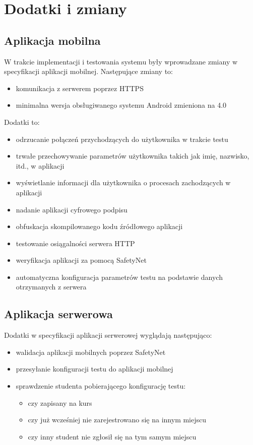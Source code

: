 \documentclass[eng]{mgr}
\begin{document}
		\section{Dodatki i zmiany}
		
			\subsection{Aplikacja mobilna}
			W trakcie implementacji i testowania systemu były wprowadzane zmiany w specyfikacji aplikacji mobilnej. Następujące zmiany to:
			\begin{itemize}
				\item komunikacja z serwerem poprzez HTTPS
				\item minimalna wersja obsługiwanego systemu Android zmieniona na 4.0
			\end{itemize}
			Dodatki to:
			\begin{itemize}
				\item odrzucanie połączeń przychodzących do użytkownika w trakcie testu
				\item trwałe przechowywanie parametrów użytkownika takich jak imię, nazwisko, itd., w aplikacji
				\item wyświetlanie informacji dla użytkownika o procesach zachodzących w aplikacji
				\item nadanie aplikacji cyfrowego podpisu
				\item obfuskacja skompilowanego kodu źródłowego aplikacji
				\item testowanie osiągalności serwera HTTP
				\item weryfikacja aplikacji za pomocą SafetyNet
				\item automatyczna konfiguracja parametrów testu na podstawie danych otrzymanych z serwera
			\end{itemize}
		
			\subsection{Aplikacja serwerowa}
			Dodatki w specyfikacji aplikacji serwerowej wyglądają następująco:
			\begin{itemize}
				\item walidacja aplikacji mobilnych poprzez SafetyNet
				\item przesyłanie konfiguracji testu do aplikacji mobilnej
				\item sprawdzenie studenta pobierającego konfigurację testu:
				\begin{itemize}
					\item czy zapisany na kurs
					\item czy już wcześniej nie zarejestrowano się na innym miejscu
					\item czy inny student nie zgłosił się na tym samym miejscu
				\end{itemize}
			\end{itemize}
		
\end{document}
